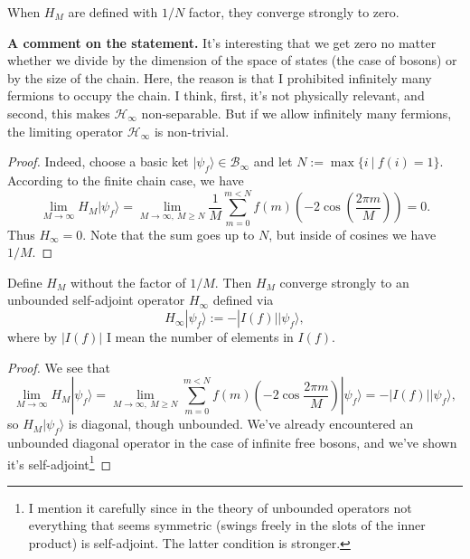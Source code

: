 \begin{statement}
When $H_M$ are defined with $1/N$ factor, they converge strongly to zero.
\end{statement}
\noindent\textbf{A comment on the statement.} It's interesting that we get zero no matter whether we divide by the dimension of the space of states (the case of bosons) or by the size of the chain. Here, the reason is that I prohibited infinitely many fermions to occupy the chain. I think, first, it's not physically relevant, and second, this makes $\mathcal H_{\infty}$ non-separable. But if we allow infinitely many fermions, the limiting operator $\mathcal H_{\infty}$ is non-trivial.
\begin{proof}
Indeed, choose a basic ket $|\psi_f \rangle \in \mathcal B_{\infty}$ and let $N := \max\{ i \ | \ f(i) = 1 \}$. According to the finite chain case, we have
\[
\lim_{M \rightarrow \infty} H_{M} |\psi_f \rangle = \lim_{M \rightarrow \infty, \ M \geq N} \frac{1}{M} \sum_{m=0}^{m < N} f(m) (-2\cos(\frac{2\pi m}{M})) = 0.
\]
Thus $H_{\infty} = 0$. Note that the sum goes up to $N$, but inside of cosines we have $1/M$.
\end{proof}
\begin{statement}
Define $H_{M}$ without the factor of $1/M$. Then $H_{M}$ converge strongly to an unbounded self-adjoint operator $H_{\infty}$ defined via
\[
H_{\infty} |\psi_f\rangle := -|I(f)| |\psi_f\rangle, 
\]
where by $|I(f)|$ I mean the number of elements in $I(f)$.
\end{statement}
\begin{proof}
We see that
\[
\lim_{M \rightarrow \infty} H_M|\psi_f\rangle =  \lim_{M \rightarrow \infty, \ M \geq N} \sum_{m=0}^{m < N} f(m) (-2\cos\frac{2\pi m}{M} ) |\psi_f\rangle = -|I(f)||\psi_f\rangle,
\]
so $H_M|\psi_f\rangle$ is diagonal, though unbounded. We've already encountered an unbounded diagonal operator in the case of infinite free bosons, and we've shown it's self-adjoint\footnote{I mention it carefully since in the theory of unbounded operators not everything that seems symmetric (swings freely in the slots of the inner product) is self-adjoint. The latter condition is stronger.}
\end{proof}

